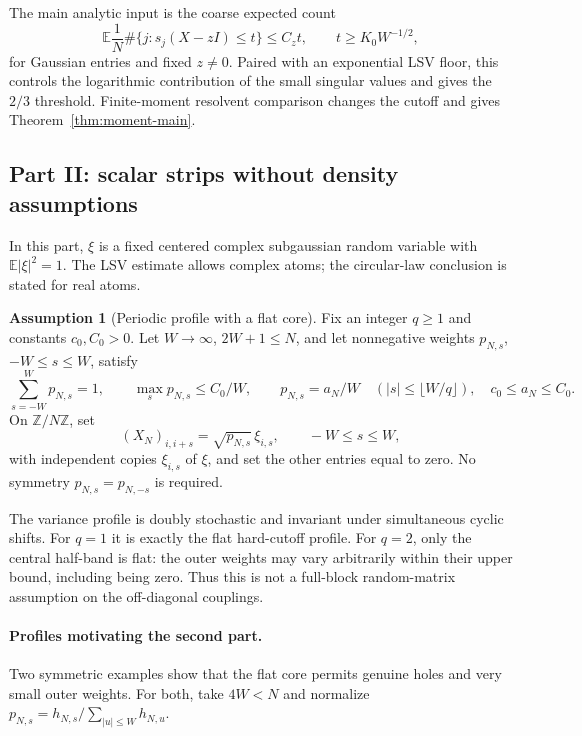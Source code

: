 \documentclass[11pt,reqno]{amsart}
\numberwithin{equation}{section}
\theoremstyle{plain}
\theoremstyle{definition}
\newtheorem{assumption}[theorem]{Assumption}
\theoremstyle{remark}
\providecommand{\blsvZ}{\mathbb Z}
\begin{document}
The main analytic input is the coarse expected count
\[
 \mathbb E\frac1N\#\{j:s_j(X-zI)\le t\}\le C_z t,
 \qquad t\ge K_0W^{-1/2},
\]
for Gaussian entries and fixed $z\ne0$. Paired with an exponential LSV
floor, this controls the logarithmic contribution of the small singular
values and gives the $2/3$ threshold. Finite-moment resolvent comparison
changes the cutoff and gives Theorem~\ref{thm:moment-main}.


\subsection{Part II: scalar strips without density assumptions}
\label{blsv:sec-statements}
In this part, $\xi$ is a fixed centered complex subgaussian random
variable with $\mathbb E|\xi|^2=1$. The LSV estimate allows complex atoms;
the circular-law conclusion is stated for real atoms.

\begin{assumption}[Periodic profile with a flat core]\label{blsv:ass-core}
Fix an integer $q\ge1$ and constants $c_0,C_0>0$. Let
$W\to\infty$, $2W+1\le N$, and let nonnegative weights
$p_{N,s}$, $-W\le s\le W$, satisfy
\begin{equation}\label{blsv:eq-profile}
 \sum_{s=-W}^W p_{N,s}=1,\qquad
 \max_s p_{N,s}\le C_0/W,\qquad
 p_{N,s}=a_N/W\quad (|s|\le\lfloor W/q\rfloor),
 \quad c_0\le a_N\le C_0.
\end{equation}
On $\blsvZ/N\blsvZ$, set
\begin{equation}\label{blsv:eq-model}
 (X_N)_{i,i+s}=\sqrt{p_{N,s}}\,\xi_{i,s},\qquad -W\le s\le W,
\end{equation}
with independent copies $\xi_{i,s}$ of $\xi$, and set the other entries
equal to zero. No symmetry $p_{N,s}=p_{N,-s}$ is required.
\end{assumption}

The variance profile is doubly stochastic and invariant under simultaneous
cyclic shifts. For $q=1$ it is exactly the flat hard-cutoff profile.
For $q=2$, only the central half-band is flat: the outer weights may vary
arbitrarily within their upper bound, including being zero. Thus this is
not a full-block random-matrix assumption on the off-diagonal couplings.

\paragraph{Profiles motivating the second part.}
Two symmetric examples show that the flat core permits genuine holes
and very small outer weights. For both, take $4W<N$ and normalize
$p_{N,s}=h_{N,s}/\sum_{|u|\le W}h_{N,u}$.
\end{document}
